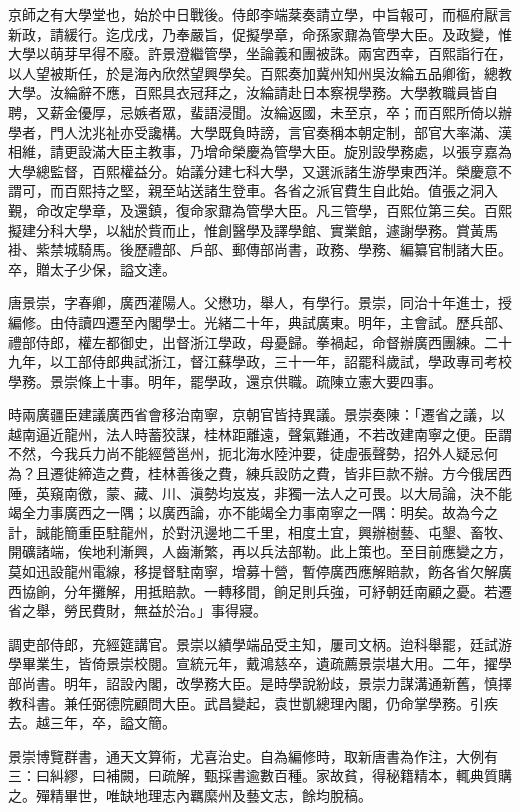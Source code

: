 \begin{pinyinscope}
京師之有大學堂也，始於中日戰後。侍郎李端棻奏請立學，中旨報可，而樞府厭言新政，請緩行。迄戊戌，乃奉嚴旨，促擬學章，命孫家鼐為管學大臣。及政變，惟大學以萌芽早得不廢。許景澄繼管學，坐論義和團被誅。兩宮西幸，百熙詣行在，以人望被斯任，於是海內欣然望興學矣。百熙奏加冀州知州吳汝綸五品卿銜，總教大學。汝綸辭不應，百熙具衣冠拜之，汝綸請赴日本察視學務。大學教職員皆自聘，又薪金優厚，忌嫉者眾，蜚語浸聞。汝綸返國，未至京，卒；而百熙所倚以辦學者，門人沈兆祉亦受讒構。大學既負時謗，言官奏稱本朝定制，部官大率滿、漢相維，請更設滿大臣主教事，乃增命榮慶為管學大臣。旋別設學務處，以張亨嘉為大學總監督，百熙權益分。始議分建七科大學，又選派諸生游學東西洋。榮慶意不謂可，而百熙持之堅，親至站送諸生登車。各省之派官費生自此始。值張之洞入覲，命改定學章，及還鎮，復命家鼐為管學大臣。凡三管學，百熙位第三矣。百熙擬建分科大學，以絀於貲而止，惟創醫學及譯學館、實業館，遽謝學務。賞黃馬褂、紫禁城騎馬。後歷禮部、戶部、郵傳部尚書，政務、學務、編纂官制諸大臣。卒，贈太子少保，謚文達。

唐景崇，字春卿，廣西灌陽人。父懋功，舉人，有學行。景崇，同治十年進士，授編修。由侍讀四遷至內閣學士。光緒二十年，典試廣東。明年，主會試。歷兵部、禮部侍郎，權左都御史，出督浙江學政，母憂歸。拳禍起，命督辦廣西團練。二十九年，以工部侍郎典試浙江，督江蘇學政，三十一年，詔罷科歲試，學政專司考校學務。景崇條上十事。明年，罷學政，還京供職。疏陳立憲大要四事。

時兩廣疆臣建議廣西省會移治南寧，京朝官皆持異議。景崇奏陳：「遷省之議，以越南逼近龍州，法人時蓄狡謀，桂林距離遠，聲氣難通，不若改建南寧之便。臣謂不然，今我兵力尚不能經營邕州，扼北海水陸沖要，徒虛張聲勢，招外人疑忌何為？且遷徙締造之費，桂林善後之費，練兵設防之費，皆非巨款不辦。方今俄居西陲，英窺南徼，蒙、藏、川、滇勢均岌岌，非獨一法人之可畏。以大局論，決不能竭全力事廣西之一隅；以廣西論，亦不能竭全力事南寧之一隅：明矣。故為今之計，誠能簡重臣駐龍州，於對汛邊地二千里，相度土宜，興辦樹藝、屯墾、畜牧、開礦諸端，俟地利漸興，人齒漸繁，再以兵法部勒。此上策也。至目前應變之方，莫如迅設龍州電線，移提督駐南寧，增募十營，暫停廣西應解賠款，飭各省欠解廣西協餉，分年攤解，用抵賠款。一轉移間，餉足則兵強，可紓朝廷南顧之憂。若遷省之舉，勞民費財，無益於治。」事得寢。

調吏部侍郎，充經筵講官。景崇以績學端品受主知，屢司文柄。迨科舉罷，廷試游學畢業生，皆倚景崇校閱。宣統元年，戴鴻慈卒，遺疏薦景崇堪大用。二年，擢學部尚書。明年，詔設內閣，改學務大臣。是時學說紛歧，景崇力謀溝通新舊，慎擇教科書。兼任弼德院顧問大臣。武昌變起，袁世凱總理內閣，仍命掌學務。引疾去。越三年，卒，謚文簡。

景崇博覽群書，通天文算術，尤喜治史。自為編修時，取新唐書為作注，大例有三：曰糾繆，曰補闕，曰疏解，甄採書逾數百種。家故貧，得秘籍精本，輒典質購之。殫精畢世，唯缺地理志內羈縻州及藝文志，餘均脫稿。


\end{pinyinscope}
